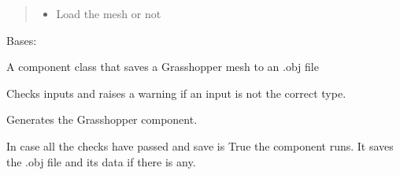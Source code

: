\documentclass[letterpaper,10pt,english]{sphinxmanual}
\begin{document}
\begin{fulllineitems}
\begin{fulllineitems}
\begin{quote}
\begin{description}
\begin{itemize}
\item {} 
 \textendash{} Load the mesh or not

\end{itemize}

\end{description}\end{quote}

\end{fulllineitems}


\end{fulllineitems}


\begin{fulllineitems}
\label{\detokenize{geometry:livestock.components.geometry.SaveMesh}}
Bases: {\hyperref[\detokenize{superclass:livestock.components.component.GHComponent}]{}}

A component class that saves a Grasshopper mesh to an .obj file

\begin{fulllineitems}
\label{\detokenize{geometry:livestock.components.geometry.SaveMesh.check_inputs}}
Checks inputs and raises a warning if an input is not the correct type.

\end{fulllineitems}


\begin{fulllineitems}
\label{\detokenize{geometry:livestock.components.geometry.SaveMesh.config}}
Generates the Grasshopper component.

\end{fulllineitems}


\begin{fulllineitems}
\label{\detokenize{geometry:livestock.components.geometry.SaveMesh.run}}
In case all the checks have passed and save is True the component runs.
It saves the .obj file and its data if there is any.


\end{fulllineitems}
\end{fulllineitems}
\end{document}

